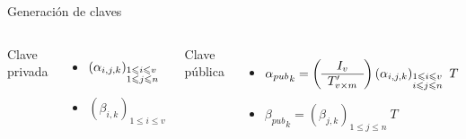 \documentclass[10pt,aspectratio=169,]{beamer}
\begin{document}

\begin{frame}[c]{Generación de claves}
    \begin{columns}[T]
	    \hspace{0.6cm}
        \Large{Clave privada}
        \vspace{0.35cm}
        \begin{itemize}
            \item $\left(\alpha_{i,j,k}\right)_{\begin{subarray}{l}{1\leqslant i \leqslant v }\\ {1 \leqslant j \leqslant n}\end{subarray}}$ 
            \item $\left(\beta_{i,k}\right)_{1\leqslant i \leqslant v }$
        \end{itemize}
        \Large{Clave pública}
        \vspace{0.2cm}
        \begin{itemize}
            \item ${\alpha_{pub}}_k = \left(
    	\begin{array}{c}
    	I_v \\
    	\hline
    	T'_{v \times m}
    	\end{array}
    	\right) \left(\alpha_{i,j,k}\right)_{\begin{subarray}{l}{1 \leqslant i\leqslant v }\\ {i\leqslant j \leqslant n}\end{subarray}} \ T$
    		\item ${\beta_{pub}}_k = \left(\beta_{j,k}\right)_{1\leqslant j\leqslant n}\ T$
        \end{itemize}
    \end{columns}
\end{frame}
\end{document}
